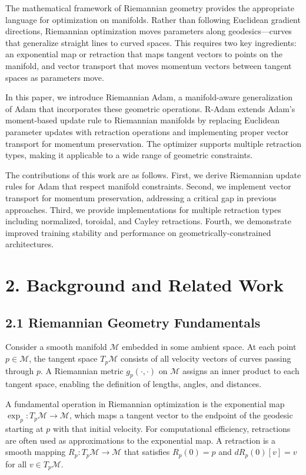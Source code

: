 \documentclass[12pt]{article}
\begin{document}
The mathematical framework of Riemannian geometry provides the appropriate language for optimization on manifolds. Rather than following Euclidean gradient directions, Riemannian optimization moves parameters along geodesics—curves that generalize straight lines to curved spaces. This requires two key ingredients: an exponential map or retraction that maps tangent vectors to points on the manifold, and vector transport that moves momentum vectors between tangent spaces as parameters move.

In this paper, we introduce Riemannian Adam, a manifold-aware generalization of Adam that incorporates these geometric operations. R-Adam extends Adam's moment-based update rule to Riemannian manifolds by replacing Euclidean parameter updates with retraction operations and implementing proper vector transport for momentum preservation. The optimizer supports multiple retraction types, making it applicable to a wide range of geometric constraints.

The contributions of this work are as follows. First, we derive Riemannian update rules for Adam that respect manifold constraints. Second, we implement vector transport for momentum preservation, addressing a critical gap in previous approaches. Third, we provide implementations for multiple retraction types including normalized, toroidal, and Cayley retractions. Fourth, we demonstrate improved training stability and performance on geometrically-constrained architectures.

\section{2. Background and Related Work}

\subsection{2.1 Riemannian Geometry Fundamentals}

Consider a smooth manifold $\mathcal{M}$ embedded in some ambient space. At each point $p \in \mathcal{M}$, the tangent space $T_p\mathcal{M}$ consists of all velocity vectors of curves passing through $p$. A Riemannian metric $g_p(\cdot, \cdot)$ on $\mathcal{M}$ assigns an inner product to each tangent space, enabling the definition of lengths, angles, and distances.

A fundamental operation in Riemannian optimization is the exponential map $\exp_p: T_p\mathcal{M} \to \mathcal{M}$, which maps a tangent vector to the endpoint of the geodesic starting at $p$ with that initial velocity. For computational efficiency, retractions are often used as approximations to the exponential map. A retraction is a smooth mapping $R_p: T_p\mathcal{M} \to \mathcal{M}$ that satisfies $R_p(0) = p$ and $dR_p(0)[v] = v$ for all $v \in T_p\mathcal{M}$.
\end{document}
